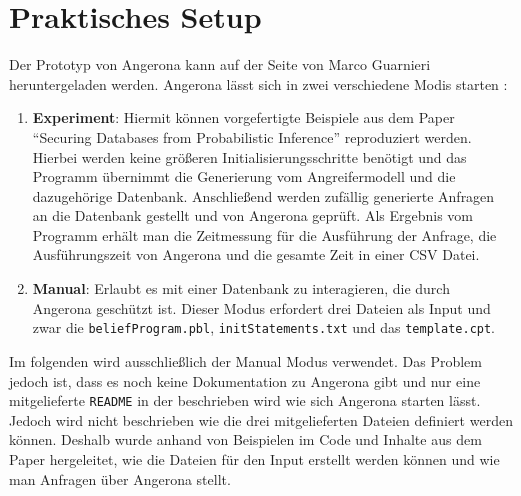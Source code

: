 \documentclass[german,version-2020-11]{uzl-thesis}
\begin{document}
\section{Praktisches Setup} \label{2.2}
Der Prototyp von Angerona kann auf der Seite von Marco Guarnieri \cite{6} heruntergeladen werden. Angerona lässt sich in zwei verschiedene Modis starten :
\begin{enumerate}
	\item \textbf{Experiment}: Hiermit können vorgefertigte Beispiele aus dem Paper \enquote{Securing Databases from Probabilistic Inference}\cite{guarnieri2017securing} reproduziert werden. Hierbei werden keine größeren Initialisierungsschritte benötigt und das Programm übernimmt die Generierung vom Angreifermodell und die dazugehörige Datenbank. Anschließend werden zufällig generierte Anfragen an die Datenbank gestellt und von Angerona geprüft. Als Ergebnis vom Programm erhält man die Zeitmessung für die Ausführung der Anfrage, die Ausführungszeit von Angerona und die gesamte Zeit in einer CSV Datei.
	\item \textbf{Manual}: Erlaubt es mit einer Datenbank zu interagieren, die durch Angerona geschützt ist. Dieser Modus erfordert drei Dateien als Input und zwar die \texttt{beliefProgram.pbl}, \texttt{initStatements.txt} und das \texttt{template.cpt}.
\end{enumerate}
Im folgenden wird ausschließlich der Manual Modus verwendet. Das Problem jedoch ist, dass es noch keine Dokumentation zu Angerona gibt und nur eine mitgelieferte \texttt{README} in der beschrieben wird wie sich Angerona starten lässt. Jedoch wird nicht beschrieben wie die drei mitgelieferten Dateien definiert werden können. Deshalb wurde anhand von Beispielen im Code und Inhalte aus dem Paper hergeleitet, wie die Dateien für den Input erstellt werden können und wie man Anfragen über Angerona stellt. 
\end{document}
